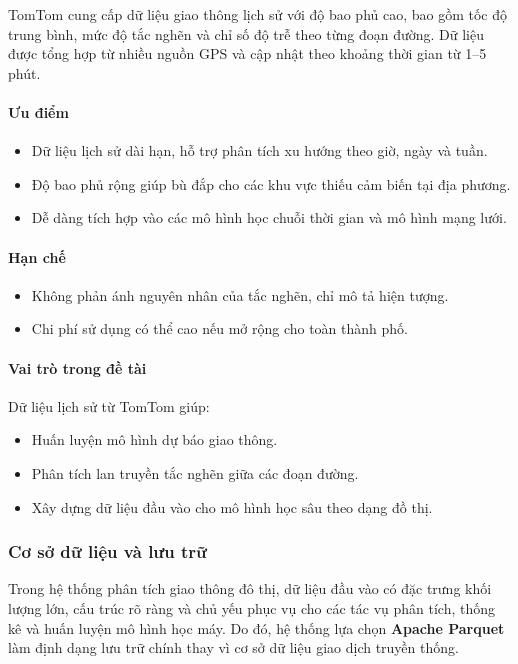 TomTom cung cấp dữ liệu giao thông lịch sử với độ bao phủ cao, bao gồm tốc độ trung bình, mức độ tắc nghẽn và chỉ số độ trễ theo từng đoạn đường. Dữ liệu được tổng hợp từ nhiều nguồn GPS và cập nhật theo khoảng thời gian từ 1--5 phút.

\paragraph{Ưu điểm}
\begin{itemize}
    \item Dữ liệu lịch sử dài hạn, hỗ trợ phân tích xu hướng theo giờ, ngày và tuần.
    \item Độ bao phủ rộng giúp bù đắp cho các khu vực thiếu cảm biến tại địa phương.
    \item Dễ dàng tích hợp vào các mô hình học chuỗi thời gian và mô hình mạng lưới.
\end{itemize}

\paragraph{Hạn chế}
\begin{itemize}
    \item Không phản ánh nguyên nhân của tắc nghẽn, chỉ mô tả hiện tượng.
    \item Chi phí sử dụng có thể cao nếu mở rộng cho toàn thành phố.
\end{itemize}

\paragraph{Vai trò trong đề tài}
Dữ liệu lịch sử từ TomTom giúp:
\begin{itemize}
    \item Huấn luyện mô hình dự báo giao thông.
    \item Phân tích lan truyền tắc nghẽn giữa các đoạn đường.
    \item Xây dựng dữ liệu đầu vào cho mô hình học sâu theo dạng đồ thị.
\end{itemize}

\subsubsection{Cơ sở dữ liệu và lưu trữ}


Trong hệ thống phân tích giao thông đô thị, dữ liệu đầu vào có đặc trưng khối lượng lớn, cấu trúc rõ ràng và chủ yếu phục vụ cho các tác vụ phân tích, thống kê và huấn luyện mô hình học máy. Do đó, hệ thống lựa chọn \textbf{Apache Parquet} làm định dạng lưu trữ chính thay vì cơ sở dữ liệu giao dịch truyền thống.

